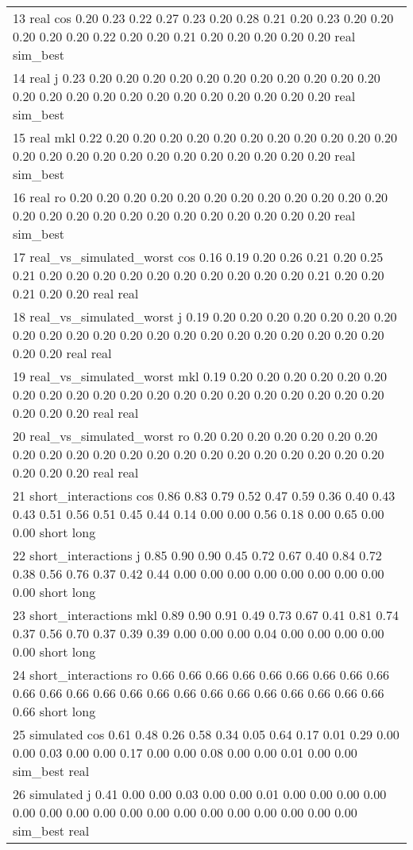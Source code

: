 \begin{table}[!tbp]
\begin{center}
\begin{tabular}{l}
13                     real cos 0.20 0.23 0.22 0.27 0.23 0.20 0.28 0.21 0.20 0.23 0.20 0.20 0.20 0.20 0.20 0.22 0.20 0.20 0.21 0.20 0.20 0.20 0.20 0.20      real  sim\_best\tabularnewline
14                     real   j 0.23 0.20 0.20 0.20 0.20 0.20 0.20 0.20 0.20 0.20 0.20 0.20 0.20 0.20 0.20 0.20 0.20 0.20 0.20 0.20 0.20 0.20 0.20 0.20      real  sim\_best\tabularnewline
15                     real mkl 0.22 0.20 0.20 0.20 0.20 0.20 0.20 0.20 0.20 0.20 0.20 0.20 0.20 0.20 0.20 0.20 0.20 0.20 0.20 0.20 0.20 0.20 0.20 0.20      real  sim\_best\tabularnewline
16                     real  ro 0.20 0.20 0.20 0.20 0.20 0.20 0.20 0.20 0.20 0.20 0.20 0.20 0.20 0.20 0.20 0.20 0.20 0.20 0.20 0.20 0.20 0.20 0.20 0.20      real  sim\_best\tabularnewline
17  real\_vs\_simulated\_worst cos 0.16 0.19 0.20 0.26 0.21 0.20 0.25 0.21 0.20 0.20 0.20 0.20 0.20 0.20 0.20 0.20 0.20 0.20 0.21 0.20 0.20 0.21 0.20 0.20      real      real\tabularnewline
18  real\_vs\_simulated\_worst   j 0.19 0.20 0.20 0.20 0.20 0.20 0.20 0.20 0.20 0.20 0.20 0.20 0.20 0.20 0.20 0.20 0.20 0.20 0.20 0.20 0.20 0.20 0.20 0.20      real      real\tabularnewline
19  real\_vs\_simulated\_worst mkl 0.19 0.20 0.20 0.20 0.20 0.20 0.20 0.20 0.20 0.20 0.20 0.20 0.20 0.20 0.20 0.20 0.20 0.20 0.20 0.20 0.20 0.20 0.20 0.20      real      real\tabularnewline
20  real\_vs\_simulated\_worst  ro 0.20 0.20 0.20 0.20 0.20 0.20 0.20 0.20 0.20 0.20 0.20 0.20 0.20 0.20 0.20 0.20 0.20 0.20 0.20 0.20 0.20 0.20 0.20 0.20      real      real\tabularnewline
21       short\_interactions cos 0.86 0.83 0.79 0.52 0.47 0.59 0.36 0.40 0.43 0.43 0.51 0.56 0.51 0.45 0.44 0.14 0.00 0.00 0.56 0.18 0.00 0.65 0.00 0.00     short      long\tabularnewline
22       short\_interactions   j 0.85 0.90 0.90 0.45 0.72 0.67 0.40 0.84 0.72 0.38 0.56 0.76 0.37 0.42 0.44 0.00 0.00 0.00 0.00 0.00 0.00 0.00 0.00 0.00     short      long\tabularnewline
23       short\_interactions mkl 0.89 0.90 0.91 0.49 0.73 0.67 0.41 0.81 0.74 0.37 0.56 0.70 0.37 0.39 0.39 0.00 0.00 0.00 0.04 0.00 0.00 0.00 0.00 0.00     short      long\tabularnewline
24       short\_interactions  ro 0.66 0.66 0.66 0.66 0.66 0.66 0.66 0.66 0.66 0.66 0.66 0.66 0.66 0.66 0.66 0.66 0.66 0.66 0.66 0.66 0.66 0.66 0.66 0.66     short      long\tabularnewline
25                simulated cos 0.61 0.48 0.26 0.58 0.34 0.05 0.64 0.17 0.01 0.29 0.00 0.00 0.03 0.00 0.00 0.17 0.00 0.00 0.08 0.00 0.00 0.01 0.00 0.00  sim\_best      real\tabularnewline
26                simulated   j 0.41 0.00 0.00 0.03 0.00 0.00 0.01 0.00 0.00 0.00 0.00 0.00 0.00 0.00 0.00 0.00 0.00 0.00 0.00 0.00 0.00 0.00 0.00 0.00  sim\_best      real\tabularnewline

\end{tabular}
\end{center}
\end{table}
